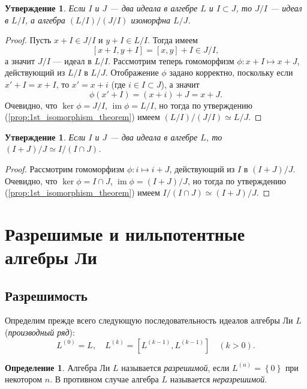 \documentclass[a4paper, 12pt]{article}
\newtheorem{proposition}[theorem]{Утверждение}
\theoremstyle{definition}
\newtheorem{definition}{Определение}[section]
\begin{document}
\begin{proposition}
    Если \({ I }\) и \({ J }\) --- два идеала в алгебре \({ L }\) и \({ I \subset J }\), то \({ J / I }\) --- идеал в \({ L / I }\), а алгебра \({ (L / I) / (J / I) }\) изоморфна \({ L / J }\).
\end{proposition}
\begin{proof}
    Пусть \({ x + I \in J / I }\) и \({ y + I \in L / I }\). Тогда имеем
    \[
        [x + I, y + I] = [x, y] + I \in J / I,
    \]
    а значит \({ J / I }\) --- идеал в \({ L / I }\). Рассмотрим теперь гомоморфизм \({ \phi : x + I \mapsto x + J }\), действующий из \({ L / I }\) в \({ L / J }\). Отображение \({ \phi }\) задано корректно, поскольку если \({ x' + I = x + I }\), то \({ x' = x + i }\) (где \({ i \in I \subset J }\)), а значит
    \[
        \phi(x' + I) = (x + i) + J = x + J.
    \]
    Очевидно, что \({ \ker \phi = J / I }\), \({ \operatorname{im} \phi = L / I }\), но тогда по утверждению (\ref{prop:1st_isomorphism_theorem}) имеем \( (L / I) / (J / I) \simeq L / J \).
\end{proof}

\begin{proposition}
    \label{prop:3rd_isomorphism_theorem}
    Если \({ I }\) и \({ J }\) --- два идеала в алгебре \({ L }\), то \({ (I + J) / J \simeq I / (I \cap J) }\).
\end{proposition}
\begin{proof}
    Рассмотрим гомоморфизм \({ \phi : i \mapsto i + J }\), действующий из \({ I }\) в \({ (I + J) / J }\). Очевидно, что \({ \ker \phi = I \cap J }\), \({ \operatorname{im} \phi = (I + J) / J }\), но тогда по утверждению (\ref{prop:1st_isomorphism_theorem}) имеем \({ I / (I \cap J) \simeq (I + J) / J }\).
\end{proof}

\section{Разрешимые и нильпотентные алгебры Ли}
\subsection{Разрешимость}

Определим прежде всего следующую последовательность идеалов алгебры Ли \({ L }\) (\textit{производный ряд}):
\[
    L^{(0)} = L, \quad L^{(k)} = [L^{(k - 1)}, L^{(k - 1)}] \quad (k > 0).
\]

\begin{definition}
Алгебра Ли \({ L }\) называется \textit{разрешимой}, если \({ L^{(n)} = \left\{ 0 \right\} }\) при некотором \({ n }\). В противном случае алгебра \({ L }\) называется \textit{неразрешимой}.
\end{definition}
\end{document}
